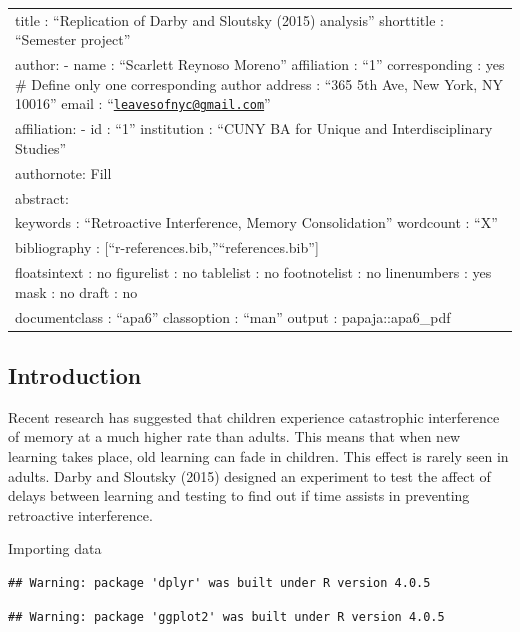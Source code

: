 \documentclass[
  english,
  man]{article}
\author{\phantom{0}}
\date{}
\affiliation{\phantom{0}}
\begin{document}
\begin{longtable}[]{@{}
  >{\raggedright\arraybackslash}p{}@{}}
\toprule
\endhead
title : ``Replication of Darby and Sloutsky (2015) analysis''
shorttitle : ``Semester project'' \\
author:
- name : ``Scarlett Reynoso Moreno''
affiliation : ``1''
corresponding : yes \# Define only one corresponding author
address : ``365 5th Ave, New York, NY 10016''
email : ``\href{mailto:leavesofnyc@gmail.com}{\nolinkurl{leavesofnyc@gmail.com}}'' \\
affiliation:
- id : ``1''
institution : ``CUNY BA for Unique and Interdisciplinary Studies'' \\
authornote: \textbar{}
Fill \\
abstract: \textbar{} \\
keywords : ``Retroactive Interference, Memory Consolidation''
wordcount : ``X'' \\
bibliography : {[}``r-references.bib,''``references.bib''{]} \\
floatsintext : no
figurelist : no
tablelist : no
footnotelist : no
linenumbers : yes
mask : no
draft : no \\
documentclass : ``apa6''
classoption : ``man''
output : papaja::apa6\_pdf \\
\bottomrule
\end{longtable}

\hypertarget{introduction}{%
\subsection{Introduction}\label{introduction}}

Recent research has suggested that children experience catastrophic interference of memory at a much higher rate than adults. This means that when new learning takes place, old learning can fade in children. This effect is rarely seen in adults. Darby and Sloutsky (2015) designed an experiment to test the affect of delays between learning and testing to find out if time assists in preventing retroactive interference.

Importing data

\begin{verbatim}
## Warning: package 'dplyr' was built under R version 4.0.5
\end{verbatim}

\begin{verbatim}
## Warning: package 'ggplot2' was built under R version 4.0.5
\end{verbatim}
\end{document}
